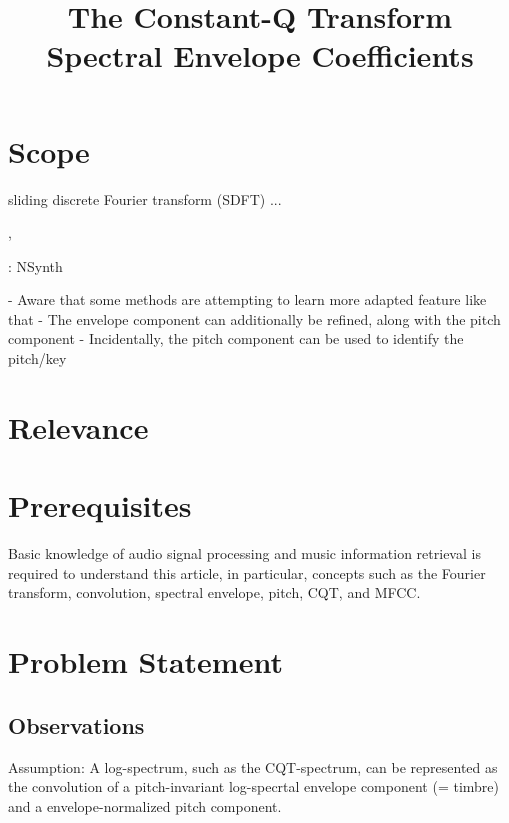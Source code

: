\documentclass[journal]{IEEEtran}
\begin{document}
\title{The Constant-Q Transform \\ Spectral Envelope Coefficients}

\maketitle


\section{Scope}

 sliding discrete Fourier transform (SDFT) ...



\cite{brown1991}, \cite{brown1992}

\cite{engel2017}: NSynth


- Aware that some methods are attempting to learn more adapted feature like that 
- The envelope component can additionally be refined, along with the pitch component
- Incidentally, the pitch component can be used to identify the pitch/key

\section{Relevance}



\section{Prerequisites}

Basic knowledge of audio signal processing and music information retrieval is required to understand this article, in particular, concepts such as the Fourier transform, convolution, spectral envelope, pitch, CQT, and MFCC.


\section{Problem Statement}

\subsection{Observations}

Assumption: A log-spectrum, such as the CQT-spectrum, can be represented as the convolution of a pitch-invariant log-specrtal envelope component (= timbre) and a envelope-normalized pitch component.
\end{document}
